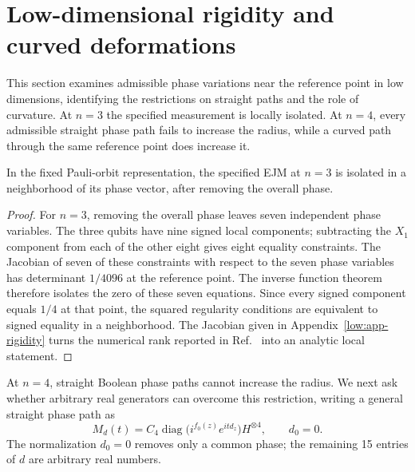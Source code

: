 \section{Low-dimensional rigidity and curved deformations}
\label{low:section}

This section examines admissible phase variations near the reference point in low dimensions, identifying the restrictions on straight paths and the role of curvature. At $n=3$ the specified measurement is locally isolated. At $n=4$, every admissible straight phase path fails to increase the radius, while a curved path through the same reference point does increase it.

\begin{proposition}[Local rigidity at $n=3$]
\label{low:rigidity}
In the fixed Pauli-orbit representation, the specified EJM at $n=3$ is
isolated in a neighborhood of its phase vector, after removing the overall
phase.
\end{proposition}

\begin{proof}
For $n=3$, removing the overall phase leaves seven independent phase variables. The three qubits have nine signed local components; subtracting the $X_1$ component from each of the other eight gives eight equality constraints. The Jacobian of seven of these constraints with respect to the seven phase variables has determinant $1/4096$ at the reference point.  The inverse function theorem therefore
isolates the zero of these seven equations.  Since every signed component
equals $1/4$ at that point, the squared regularity conditions are equivalent
to signed equality in a neighborhood.  The Jacobian given in
Appendix~\ref{low:app-rigidity} turns the numerical rank reported in
Ref.~\cite{PauwelsGisin2026} into an analytic local statement.
\end{proof}

At $n=4$, straight Boolean phase paths cannot increase the radius. We next ask whether arbitrary real generators can overcome this restriction, writing a general straight phase path as
\begin{equation}
 M_d(t)=C_4\operatorname{diag}
 \bigl(i^{f_0(z)}e^{itd_z}\bigr)H^{\otimes4},\qquad d_0=0.
 \label{low:line}
\end{equation}
The normalization $d_0=0$ removes only a common phase; the remaining
15 entries of $d$ are arbitrary real numbers.

